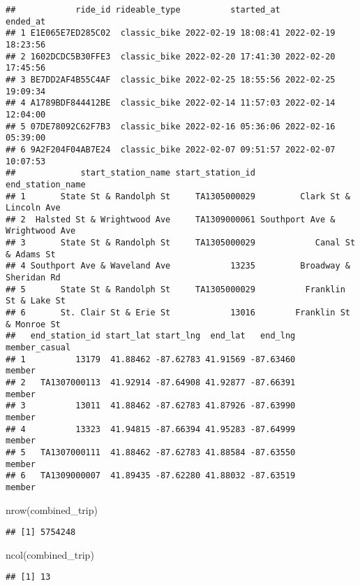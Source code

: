 \documentclass[
]{article}
\newenvironment{Shaded}{\begin{snugshade}}{\end{snugshade}}
\newcommand{\FunctionTok}[1]{\textcolor[rgb]{0.00,0.00,0.00}{#1}}
\newcommand{\NormalTok}[1]{#1}
\begin{document}
\begin{verbatim}
##            ride_id rideable_type          started_at            ended_at
## 1 E1E065E7ED285C02  classic_bike 2022-02-19 18:08:41 2022-02-19 18:23:56
## 2 1602DCDC5B30FFE3  classic_bike 2022-02-20 17:41:30 2022-02-20 17:45:56
## 3 BE7DD2AF4B55C4AF  classic_bike 2022-02-25 18:55:56 2022-02-25 19:09:34
## 4 A1789BDF844412BE  classic_bike 2022-02-14 11:57:03 2022-02-14 12:04:00
## 5 07DE78092C62F7B3  classic_bike 2022-02-16 05:36:06 2022-02-16 05:39:00
## 6 9A2F204F04AB7E24  classic_bike 2022-02-07 09:51:57 2022-02-07 10:07:53
##             start_station_name start_station_id               end_station_name
## 1       State St & Randolph St     TA1305000029         Clark St & Lincoln Ave
## 2  Halsted St & Wrightwood Ave     TA1309000061 Southport Ave & Wrightwood Ave
## 3       State St & Randolph St     TA1305000029            Canal St & Adams St
## 4 Southport Ave & Waveland Ave            13235         Broadway & Sheridan Rd
## 5       State St & Randolph St     TA1305000029          Franklin St & Lake St
## 6       St. Clair St & Erie St            13016        Franklin St & Monroe St
##   end_station_id start_lat start_lng  end_lat   end_lng member_casual
## 1          13179  41.88462 -87.62783 41.91569 -87.63460        member
## 2   TA1307000113  41.92914 -87.64908 41.92877 -87.66391        member
## 3          13011  41.88462 -87.62783 41.87926 -87.63990        member
## 4          13323  41.94815 -87.66394 41.95283 -87.64999        member
## 5   TA1307000111  41.88462 -87.62783 41.88584 -87.63550        member
## 6   TA1309000007  41.89435 -87.62280 41.88032 -87.63519        member
\end{verbatim}

\begin{Shaded}
\begin{Highlighting}[]
\FunctionTok{nrow}\NormalTok{(combined\_trip)}
\end{Highlighting}
\end{Shaded}

\begin{verbatim}
## [1] 5754248
\end{verbatim}

\begin{Shaded}
\begin{Highlighting}[]
\FunctionTok{ncol}\NormalTok{(combined\_trip)}
\end{Highlighting}
\end{Shaded}

\begin{verbatim}
## [1] 13
\end{verbatim}
\end{document}
